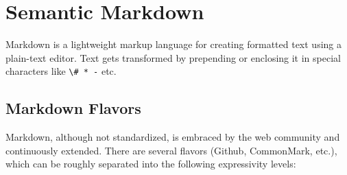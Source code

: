\chapter{Semantic Markdown} \label{ch:markdown}






Markdown is a lightweight markup language for creating formatted text using a plain-text editor. Text gets transformed by prepending or enclosing it in special characters like \verb|\# * -| etc.

\section{Markdown Flavors}

Markdown, although not standardized, is embraced by the web community and continuously extended. There are several flavors (Github, CommonMark, etc.), which can be roughly separated into the following expressivity levels:

